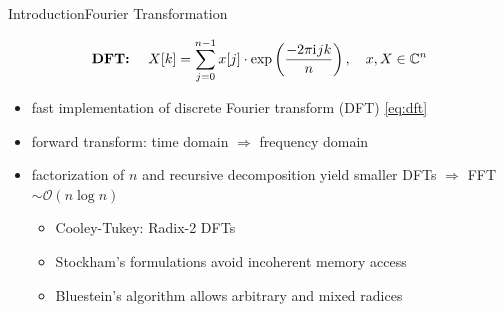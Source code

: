 \documentclass[t,11pt,hyperref={
  pdftitle = {gearshifft},
  pdfsubject = {gearshifft},
  pdfborder={0 0 0},
  colorlinks=true,
  urlcolor=red,
  citecolor=red,
  linkcolor=red,
  pdfauthor={Peter Steinbach, Matthias Werner}
  }
]{beamer}
\newcommand{\iu}{{\mathrm{i}\mkern1mu}}
\begin{document}
\begin{frame}{Introduction}{Fourier Transformation}

\vfill
  \begin{equation}
    \label{eq:dft}
    \text{\textbf{DFT:} }\quad X[k] = \sum_{j=0}^{n-1} x[j]\cdot\exp\left(\frac{-2\pi \iu jk}{n}\right),\quad x,X\in\mathbb{C}^n
  \end{equation}
\vfill  
  \begin{itemize}
  \item fast implementation of discrete Fourier transform (DFT) \eqref{eq:dft}
  \item forward transform: time domain $\Rightarrow$ frequency domain
  \item factorization of $n$ and recursive decomposition yield smaller DFTs $\Rightarrow$ FFT$\sim\mathcal{O}(n\log n)$

    \begin{itemize}
    \item Cooley-Tukey: Radix-2 DFTs
    \item Stockham's formulations avoid incoherent memory access
    \item Bluestein's algorithm allows arbitrary and mixed radices
    \end{itemize}

  \end{itemize}
\vfill

\end{frame}
\end{document}
